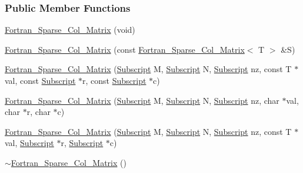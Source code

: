 \subsubsection*{Public Member Functions}
\begin{DoxyCompactItemize}
\item 
\hyperlink{class_t_n_t_1_1_fortran___sparse___col___matrix_ab519171fef0149fb4a6fcc64222b6b3f}{Fortran\_\-Sparse\_\-Col\_\-Matrix} (void)
\item 
\hyperlink{class_t_n_t_1_1_fortran___sparse___col___matrix_a83048af64f764d965e0e35215f961c33}{Fortran\_\-Sparse\_\-Col\_\-Matrix} (const \hyperlink{class_t_n_t_1_1_fortran___sparse___col___matrix}{Fortran\_\-Sparse\_\-Col\_\-Matrix}$<$ T $>$ \&S)
\item 
\hyperlink{class_t_n_t_1_1_fortran___sparse___col___matrix_a6c1c3bbda44ad4c414644994987e171c}{Fortran\_\-Sparse\_\-Col\_\-Matrix} (\hyperlink{namespace_t_n_t_af22e3f1460e145c04ce4e7d701e4c1c1}{Subscript} M, \hyperlink{namespace_t_n_t_af22e3f1460e145c04ce4e7d701e4c1c1}{Subscript} N, \hyperlink{namespace_t_n_t_af22e3f1460e145c04ce4e7d701e4c1c1}{Subscript} nz, const T $\ast$val, const \hyperlink{namespace_t_n_t_af22e3f1460e145c04ce4e7d701e4c1c1}{Subscript} $\ast$r, const \hyperlink{namespace_t_n_t_af22e3f1460e145c04ce4e7d701e4c1c1}{Subscript} $\ast$c)
\item 
\hyperlink{class_t_n_t_1_1_fortran___sparse___col___matrix_ae58f2b02877a038b958c3c8a2ae37b45}{Fortran\_\-Sparse\_\-Col\_\-Matrix} (\hyperlink{namespace_t_n_t_af22e3f1460e145c04ce4e7d701e4c1c1}{Subscript} M, \hyperlink{namespace_t_n_t_af22e3f1460e145c04ce4e7d701e4c1c1}{Subscript} N, \hyperlink{namespace_t_n_t_af22e3f1460e145c04ce4e7d701e4c1c1}{Subscript} nz, char $\ast$val, char $\ast$r, char $\ast$c)
\item 
\hyperlink{class_t_n_t_1_1_fortran___sparse___col___matrix_a0440e5dc79a84ed14c3dbbd73d4d1430}{Fortran\_\-Sparse\_\-Col\_\-Matrix} (\hyperlink{namespace_t_n_t_af22e3f1460e145c04ce4e7d701e4c1c1}{Subscript} M, \hyperlink{namespace_t_n_t_af22e3f1460e145c04ce4e7d701e4c1c1}{Subscript} N, \hyperlink{namespace_t_n_t_af22e3f1460e145c04ce4e7d701e4c1c1}{Subscript} nz, const T $\ast$val, \hyperlink{namespace_t_n_t_af22e3f1460e145c04ce4e7d701e4c1c1}{Subscript} $\ast$r, \hyperlink{namespace_t_n_t_af22e3f1460e145c04ce4e7d701e4c1c1}{Subscript} $\ast$c)
\item 
\hyperlink{class_t_n_t_1_1_fortran___sparse___col___matrix_a935af443a5f0203373addfe47162cce6}{$\sim$Fortran\_\-Sparse\_\-Col\_\-Matrix} ()
\item 

\end{DoxyCompactItemize}
